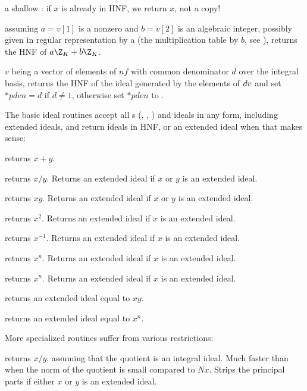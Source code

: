  a shallow : if $x$
is already in HNF, we return $x$, not a copy!

 assuming $a = v[1]$ is a nonzero
 and $b = v[2]$ is an algebraic integer, possibly given in regular
representation by a  (the multiplication table by $b$, see
), returns the HNF of $a\Z_K+b\Z_K$.

 $v$ being a vector of
elements of $nf$ with common denominator $d$ over the integral basis, returns
the HNF of the ideal generated by the elements of $d\*v$ and set $*pden=d$ if
$d\neq 1$, otherwise set $*pden$ to .


The basic ideal routines accept all s (, ,
) and ideals in any form, including extended ideals, and return
ideals in HNF, or an extended ideal when that makes sense:

 returns $x+y$.

 returns $x/y$. Returns an extended
ideal if $x$ or $y$ is an extended ideal.

 returns $xy$.
Returns an extended ideal if $x$ or $y$ is an extended ideal.

 returns $x^2$.
Returns an extended ideal if $x$ is an extended ideal.

 returns $x^{-1}$.
Returns an extended ideal if $x$ is an extended ideal.

 returns $x^n$.
Returns an extended ideal if $x$ is an extended ideal.

 returns $x^n$.
Returns an extended ideal if $x$ is an extended ideal.

 returns an extended ideal equal
to $xy$.

 returns an extended ideal equal
to $x^n$.

More specialized routines suffer from various restrictions:

 returns $x/y$, assuming that
the quotient is an integral ideal. Much faster than  when the
norm of the quotient is small compared to $Nx$. Strips the principal parts
if either $x$ or $y$ is an extended ideal.

